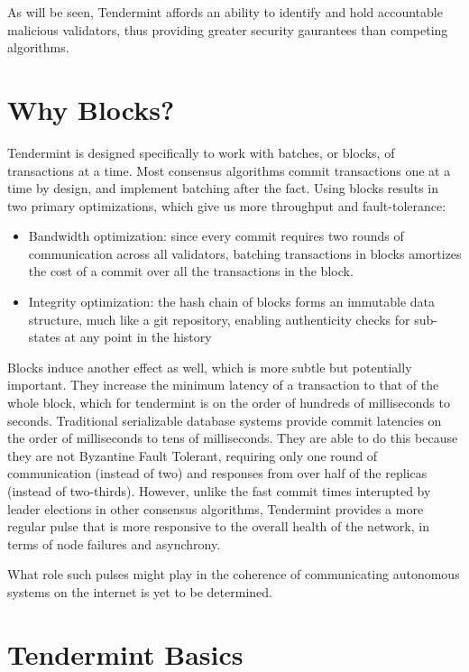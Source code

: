 As will be seen, Tendermint affords an ability to identify and hold accountable malicious validators, thus providing greater security gaurantees than competing algorithms.

\section{Why Blocks?}

Tendermint is designed specifically to work with batches, or blocks, of transactions at a time.
Most consensus algorithms commit transactions one at a time by design, and implement batching after the fact.
Using blocks results in two primary optimizations, which give us more throughput and fault-tolerance:

\begin{itemize}
\item{Bandwidth optimization: since every commit requires two rounds of communication across all validators, 
	batching transactions in blocks amortizes the cost of a commit over all the transactions in the block.}
\item{Integrity optimization: the hash chain of blocks forms an immutable data structure, much like a git repository, enabling authenticity checks for sub-states at any point in the history}
\end{itemize}

Blocks induce another effect as well, which is more subtle but potentially important. 
They increase the minimum latency of a transaction to that of the whole block, which for tendermint is on the order of hundreds of milliseconds to seconds.
Traditional serializable database systems provide commit latencies on the order of milliseconds to tens of milliseconds.
They are able to do this because they are not Byzantine Fault Tolerant, requiring only one round of communication (instead of two)
and responses from over half of the replicas (instead of two-thirds).
However, unlike the fast commit times interupted by leader elections in other consensus algorithms,
Tendermint provides a more regular pulse that is more responsive to the overall health of the network, in terms of node failures and asynchrony.

What role such pulses might play in the coherence of communicating autonomous systems on the internet is yet to be determined.

\section{Tendermint Basics}

